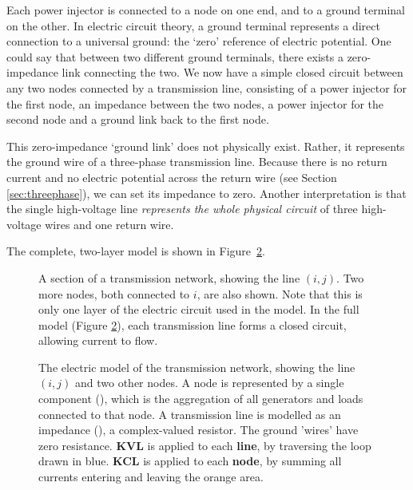\documentclass[main.tex]{subfiles}
\begin{document}
Each power injector is connected to a node on one end, and to a ground terminal on the other. In electric circuit theory, a ground terminal represents a direct connection to a universal ground: the `zero' reference of electric potential. One could say that between two different ground terminals, there exists a zero-impedance link connecting the two.
We now have a simple closed circuit between any two nodes connected by a transmission line, consisting of a power injector for the first node, an impedance between the two nodes, a power injector for the second node and a ground link back to the first node.

This zero-impedance `ground link' does not physically exist. Rather, it represents the ground wire of a three-phase transmission line. Because there is no return current and no electric potential across the return wire (see Section \ref{sec:threephase}), we can set its impedance to zero. Another interpretation is that the single high-voltage line \emph{represents the whole physical circuit} of three high-voltage wires and one return wire.

The complete, two-layer model is shown in Figure~\ref{fig:KVLcircuitside}.

\begin{figure}
    \centering
    \begin{adjustbox}{width=.6\textwidth}
    
    \end{adjustbox}
    \caption{A section of a transmission network, showing the line $(i,j)$. Two more nodes, both connected to $i$, are also shown. Note that this is only one layer of the electric circuit used in the model. In the full model (Figure \ref{fig:KVLcircuitside}), each transmission line forms a closed circuit, allowing current to flow.}
    \label{fig:KVLcircuit}
\end{figure}

\begin{figure}
    \centering
    \begin{adjustbox}{width=.9\textwidth}
    
    \end{adjustbox}
    \caption{
    The electric model of the transmission network, showing the line $(i,j)$ and two other nodes. A node is represented by a single component (\inlineac), which is the aggregation of all generators and loads connected to that node. A transmission line is modelled as an impedance (\inlineres), a complex-valued resistor. The ground 'wires' have zero resistance. \protect\newline
    \textbf{KVL} is applied to each \textbf{line}, by traversing the loop drawn in blue.\protect\newline
    \textbf{KCL} is applied to each \textbf{node}, by summing all currents entering and leaving the orange area.}
    \label{fig:KVLcircuitside}
\end{figure}
\end{document}
